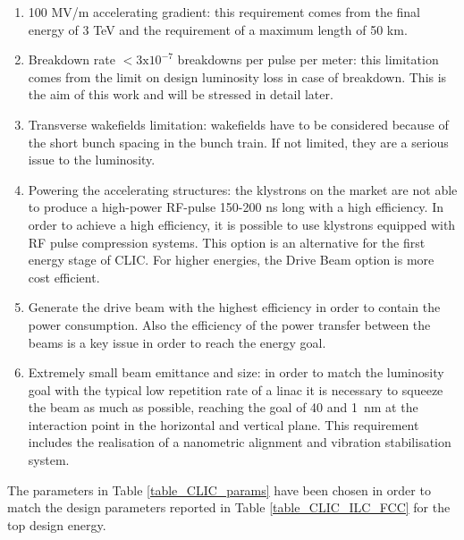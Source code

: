 \begin{enumerate}
\item 100 MV/m accelerating gradient: this requirement comes from the final energy of 3 TeV and the requirement of a maximum length of 50 km.
\item Breakdown rate $< 3\text{x}10^{-7}$ breakdowns per pulse per meter: this limitation comes from the limit on design luminosity loss in case of breakdown. This is the aim of this work and will be stressed in detail later.
\item Transverse wakefields limitation: wakefields have to be considered because of the short bunch spacing in the bunch train. If not limited, they are a serious issue to the luminosity.
\item Powering the accelerating structures: the klystrons on the market are not able to produce a high-power RF-pulse 150-200 ns long with a high efficiency. In order to achieve a high efficiency, it is possible to use klystrons equipped with RF pulse compression systems. This option is an alternative for the first energy stage of CLIC. For higher energies, the Drive Beam option is more cost efficient.
\item Generate the drive beam with the highest efficiency in order to contain the power consumption. Also the efficiency of the power transfer between the beams is a key issue in order to reach the energy goal.
\item Extremely small beam emittance and size: in order to match the luminosity goal with the typical low repetition rate of a linac it is necessary to squeeze the beam as much as possible, reaching the goal of 40 and 1~nm at the interaction point in the horizontal and vertical plane. This requirement includes the realisation of a nanometric alignment and vibration stabilisation system.
\end{enumerate}



The parameters in Table \ref{table_CLIC_params} have been chosen in order to match the design parameters reported in Table \ref{table_CLIC_ILC_FCC} for the top design energy.



